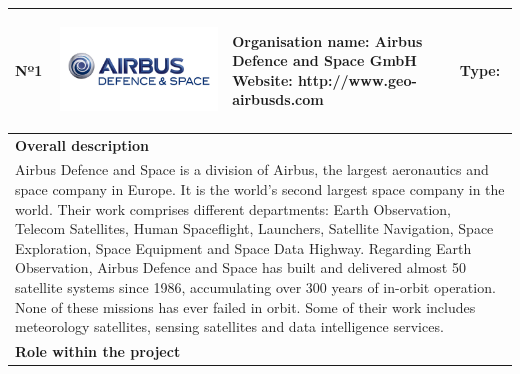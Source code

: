 \begin{longtable}[H]{|p{0.7cm}|p{4cm}|p{7cm}|p{1.3cm}|}
	\hline
	\begin{center} Nº1 \end{center} & \begin{center} \includegraphics[scale=0.09]{./logos/Airbus-defence-and-space-logo} \end{center} & \begin{center} \textbf{Organisation name:} Airbus Defence and Space GmbH \newline \textbf{Website:} http://www.geo-airbusds.com \end{center} & \begin{center} Type: \end{center} \\ \hline
	
	\multicolumn{4}{|p{13cm}|}{\textbf{Overall description}}  \\ \hline
	
	\multicolumn{4}{|p{14.5cm}|}{Airbus Defence and Space is a division of Airbus, the largest aeronautics and space company in Europe. It is the world's second largest space company in the world. Their work comprises different departments: Earth Observation, Telecom Satellites, Human Spaceflight, Launchers, Satellite Navigation, Space Exploration, Space Equipment and Space Data Highway. \newline Regarding Earth Observation, Airbus Defence and Space has built and delivered almost 50 satellite systems since 1986, accumulating over 300 years of in-orbit operation. None of these missions has ever failed in orbit. Some of their work includes meteorology satellites, sensing satellites and data intelligence services.}  \\ \hline
	
	\multicolumn{4}{|p{13cm}|}{\textbf{Role within the project}}   \\ \hline
	

\end{longtable}
